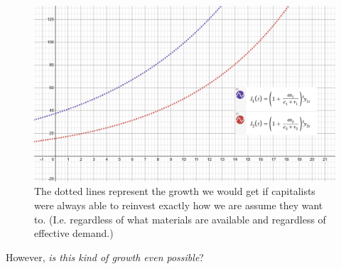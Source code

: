 \documentclass{article}
\theoremstyle{theorem}
\begin{document}
\begin{figure}[H]
\centering
\includegraphics[scale=.5]{Images/dotted}
\caption{The dotted lines represent the growth we would get if capitalists were always able to reinvest exactly how we are assume they want to. (I.e. regardless of what materials are available and regardless of effective demand.)} 
\end{figure}
However, \emph{is this kind of growth even possible}?
\end{document}
